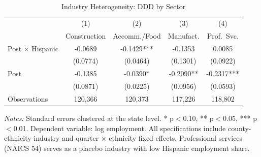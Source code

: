 \begin{table}[H]
\centering
\caption{Industry Heterogeneity: DDD by Sector}
\label{tab:industry}
\begin{threeparttable}
\begin{tabular}{lcccc}
\toprule
 & (1) & (2) & (3) & (4) \\
 & Construction & Accomm./Food & Manufact. & Prof.\ Svc. \\
\midrule
Post $\times$ Hispanic & -0.0689 & -0.1429*** & -0.1353 & 0.0085 \\
 & (0.0774) & (0.0464) & (0.1301) & (0.0922) \\[3pt]
Post & -0.1385 & -0.0390* & -0.2090** & -0.2317*** \\
 & (0.0871) & (0.0225) & (0.0956) & (0.0593) \\[6pt]
Observations & 120,366 & 120,373 & 117,226 & 118,802 \\
\bottomrule
\end{tabular}
\begin{tablenotes}[flushleft]
\small
\item \textit{Notes:} Standard errors clustered at the state level. * p$<$0.10, ** p$<$0.05, *** p$<$0.01. Dependent variable: log employment. All specifications include county-ethnicity-industry and quarter $\times$ ethnicity fixed effects. Professional services (NAICS 54) serves as a placebo industry with low Hispanic employment share.
\end{tablenotes}
\end{threeparttable}
\end{table}
